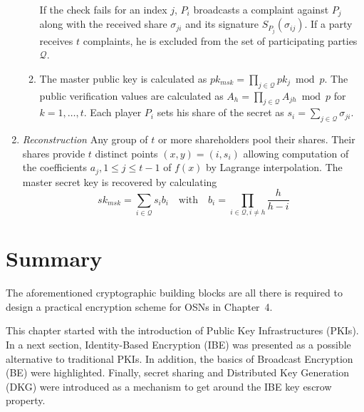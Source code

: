 \begin{algorithm}
\begin{enumerate}
\begin{enumerate}
    If the check fails for an index $j$, $P_i$ broadcasts a complaint against $P_j$ along with the received share $\sigma_{ji}$ and its signature $S_{P_j} \left( \sigma_{ij} \right)$. If a party receives $t$ complaints, he is excluded from the set of participating parties $\mathcal{Q}$.
    \item The master public key is calculated as $pk_{msk} = \prod_{j \in \mathcal{Q}} pk_j \bmod p$. The public verification values are calculated as $A_h = \prod_{j \in \mathcal{Q}}A_{jh} \bmod p$ for $k=1, \ldots, t$. Each player $P_i$ sets his share of the secret as $s_i = \sum_{j \in \mathcal{Q}} \sigma_{ji}$.
   \end{enumerate}
   \item \textit{Reconstruction} Any group of $t$ or more shareholders pool their shares. Their shares provide $t$ distinct points $\left( x, y \right) = \left( i, s_i \right)$ allowing computation of the coefficients $a_j, 1 \leq j \leq t-1$ of $f \left( x \right)$ by Lagrange interpolation. The master secret key is recovered by calculating
   \begin{equation*}
    sk_{msk} = \sum_{i \in \mathcal{Q}} s_i b_i \quad \textrm{with} \quad b_i = \prod_{i \in \mathcal{Q}, i \neq h} \frac{h}{h-i}
   \end{equation*}
 \end{enumerate}
\end{algorithm}

\section{Summary}
The aforementioned cryptographic building blocks are all there is required to design a practical encryption scheme for OSNs in Chapter~4.

This chapter started with the introduction of Public Key Infrastructures (PKIs). In a next section, Identity-Based Encryption (IBE) was presented as a possible alternative to traditional PKIs. In addition, the basics of Broadcast Encryption (BE) were highlighted. Finally, secret sharing and Distributed Key Generation (DKG) were introduced as a mechanism to get around the IBE key escrow property.

